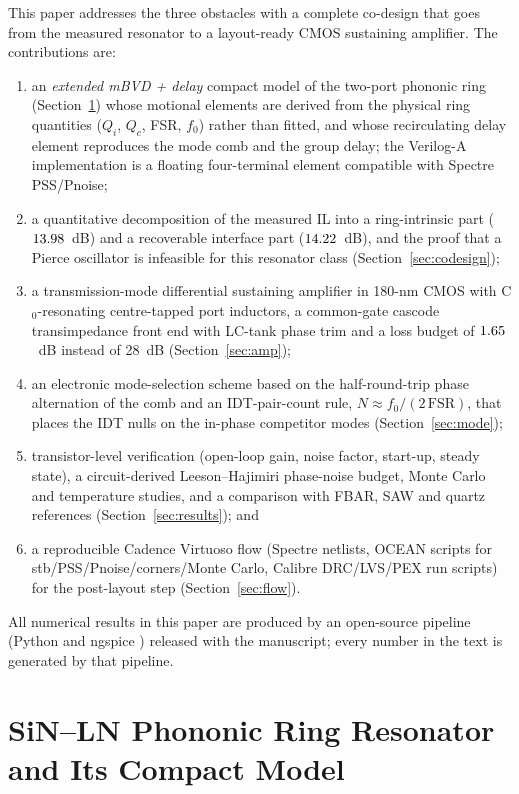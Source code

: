 \documentclass[journal]{IEEEtran}
\begin{document}
This paper addresses the three obstacles with a complete co-design that goes from the measured resonator to a layout-ready CMOS sustaining amplifier. The contributions are:
\begin{enumerate}
\item an \emph{extended mBVD + delay} compact model of the two-port phononic ring (Section~\ref{sec:model}) whose motional elements are derived from the physical ring quantities ($Q_i$, $Q_c$, FSR, $f_0$) rather than fitted, and whose recirculating delay element reproduces the mode comb and the group delay; the Verilog-A implementation is a floating four-terminal element compatible with Spectre PSS/Pnoise;
\item a quantitative decomposition of the measured IL into a ring-intrinsic part ($13.98$~dB) and a recoverable interface part ($14.22$~dB), and the proof that a Pierce oscillator is infeasible for this resonator class (Section~\ref{sec:codesign});
\item a transmission-mode differential sustaining amplifier in 180-nm CMOS with C$_0$-resonating centre-tapped port inductors, a common-gate cascode transimpedance front end with LC-tank phase trim and a loss budget of $1.65$~dB instead of 28~dB (Section~\ref{sec:amp});
\item an electronic mode-selection scheme based on the half-round-trip phase alternation of the comb and an IDT-pair-count rule, $N\approx f_0/(2\,\mathrm{FSR})$, that places the IDT nulls on the in-phase competitor modes (Section~\ref{sec:mode});
\item transistor-level verification (open-loop gain, noise factor, start-up, steady state), a circuit-derived Leeson--Hajimiri phase-noise budget, Monte Carlo and temperature studies, and a comparison with FBAR, SAW and quartz references (Section~\ref{sec:results}); and
\item a reproducible Cadence Virtuoso flow (Spectre netlists, OCEAN scripts for stb/PSS/Pnoise/corners/Monte Carlo, Calibre DRC/LVS/PEX run scripts) for the post-layout step (Section~\ref{sec:flow}).
\end{enumerate}
All numerical results in this paper are produced by an open-source pipeline (Python and ngspice \cite{ngspice}) released with the manuscript; every number in the text is generated by that pipeline.

\section{SiN--LN Phononic Ring Resonator and Its Compact Model}\label{sec:model}
\end{document}
